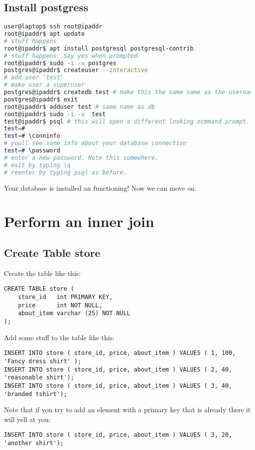 \documentclass[12pt]{article}
\begin{document}
\subsection{Install postgress}
\begin{lstlisting}[language=bash]
user@laptop$ ssh root@ipaddr
root@ipaddr$ apt update
# stuff happens
root@ipaddr$ apt install postgresql postgresql-contrib
# stuff happens. Say yes when prompted.
root@ipaddr$ sudo -i -u postgres
postgres@ipaddr$ createuser --interactive
# add user 'test'
# make user a superuser
postgres@ipaddr$ createdb test # make this the same name as the username you created
postgres@ipaddr$ exit
root@ipaddr$ adduser test # same name as db
root@ipaddr$ sudo -i -u  test
test@ipaddr$ psql # this will open a different looking ocmmand prompt. That is the postgres prompt
test=# 
test=# \conninfo
# youll see some info about your database connection
test=# \password
# enter a new password. Note this somewhere.
# exit by typing \q
# reenter by typing psql as before.
\end{lstlisting}

Your database is installed an functioning! Now we can move on.

\section{ Perform an inner join }

\subsection{Create Table store}
Create the table like this:
\begin{lstlisting}
CREATE TABLE store (
	store_id   int PRIMARY KEY,
	price      int NOT NULL,
	about_item varchar (25) NOT NULL
);
\end{lstlisting}

Add some stuff to the table like this:

\begin{lstlisting}
INSERT INTO store ( store_id, price, about_item ) VALUES ( 1, 100, 'Fancy dress shirt' );
INSERT INTO store ( store_id, price, about_item ) VALUES ( 2, 40, 'reasonable shirt');
INSERT INTO store ( store_id, price, about_item ) VALUES ( 3, 40, 'branded tshirt');
\end{lstlisting}

Note that if you try to add an element with a primary key that is already there it will yell at you:
\begin{lstlisting}
INSERT INTO store ( store_id, price, about_item ) VALUES ( 3, 20, 'another shirt');
\end{lstlisting}
\end{document}
